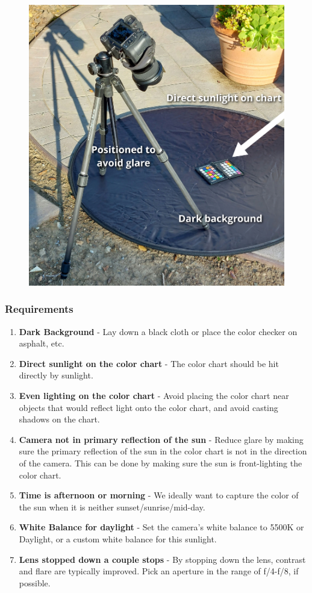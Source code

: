 \documentclass[twoside]{article}
\begin{document}
\begin{figure}[ht]
    \centering
    \includegraphics[scale=0.08]{images/sunlight_color_chart_setup0000.jpg}
\end{figure}

\subsubsection{Requirements}
\begin{enumerate}
    \item \textbf{Dark Background} - Lay down a black cloth or place the color checker on asphalt, etc.
    \item \textbf{Direct sunlight on the color chart} - The color chart should be hit directly by sunlight.
    \item \textbf{Even lighting on the color chart} - Avoid placing the color chart near objects that would reflect light onto the color chart, and avoid casting shadows on the chart.
    \item \textbf{Camera not in primary reflection of the sun} - Reduce glare by making sure the primary reflection of the sun in the color chart is not in the direction of the camera. This can be done by making sure the sun is front-lighting the color chart.
    \item \textbf{Time is afternoon or morning} - We ideally want to capture the color of the sun when it is neither sunset/sunrise/mid-day.
    \item \textbf{White Balance for daylight} - Set the camera's white balance to 5500K or Daylight, or a custom white balance for this sunlight.
    \item \textbf{Lens stopped down a couple stops} - By stopping down the lens, contrast and flare are typically improved. Pick an aperture in the range of f/4-f/8, if possible.
\end{enumerate}
\end{document}
